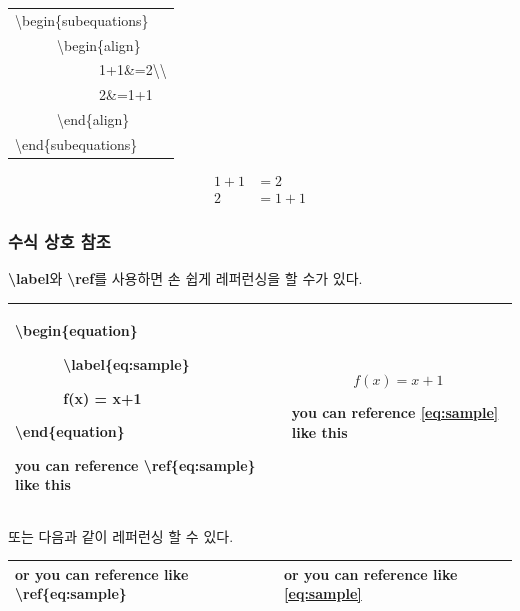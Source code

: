 \documentclass[12pt]{article}
\begin{document}
	\begin{tabularx}{\textwidth\onehalfspacing}{|X|}
		\hline
		\textbackslash begin\{subequations\}\\
		\ \ \ \ \ \ \textbackslash begin\{align\}\\
		\ \ \ \ \ \ \ \ \ \ \ \ 1+1\&=2\textbackslash\textbackslash\\
		\ \ \ \ \ \ \ \ \ \ \ \ 2\&=1+1\\
		\ \ \ \ \ \ \textbackslash end\{align\}\\
		\textbackslash end\{subequations\}\\
		\hline
	\end{tabularx}
	\begin{subequations}
		\label{eq:align}
		\begin{align}
		1+1&=2\\
		2&=1+1
		\end{align}
	\end{subequations}\clearpage
	\subsubsection{수식 상호 참조}
	\textbf{\textbackslash label}와 \textbf{\textbackslash ref}를 사용하면 손 쉽게 레퍼런싱을 할 수가 있다.\newline
	
	\begin{tabularx}{\textwidth\onehalfspacing}{|X|X|}
		\hline
		\textbackslash begin\{equation\}
		
		\ \ \ \ \ \ \textbackslash label\{eq:sample\}
		
		\ \ \ \ \ \ f(x) = x+1
		
		\textbackslash end\{equation\}
		
		you can reference \textbackslash ref\{eq:sample\} like this
		&\begin{equation}
			\label{eq:sample}
			f(x)=x+1
		\end{equation}
		
		you can reference \ref{eq:sample} like this\\
		\hline
	\end{tabularx}\newline\newline
	또는 다음과 같이 레퍼런싱 할 수 있다.\newline
	
	\begin{tabularx}{\textwidth\onehalfspacing}{|X|X|}
		\hline
		or you can reference like \textbackslash ref\{eq:sample\}
		&or you can reference like \eqref{eq:sample}\\
		\hline
	\end{tabularx}
\end{document}
